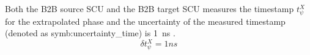 
Both the B2B source SCU and the B2B target SCU measures the timestamp $t_\psi^X$ for the extrapolated phase and the uncertainty of the measured timestamp (denoted as \gls{symb:uncertainty_time}) is \SI{1}{ns} .  
\begin{equation} 
\delta t_\psi^X= 1ns
\label{jitter_measure_t}
\end{equation}

